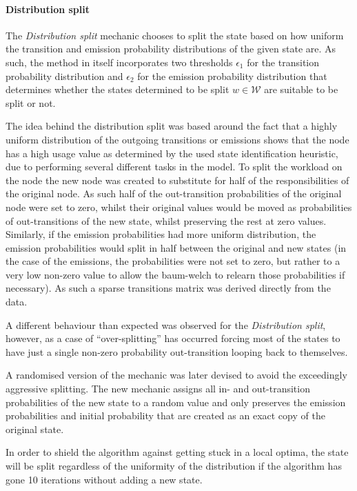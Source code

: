 \paragraph{Distribution split}
The \emph{Distribution split} mechanic chooses to split the state based on how uniform the transition and emission probability distributions of the given state are. As such, the method in itself incorporates two thresholds $\epsilon_1$ for the transition probability distribution and $\epsilon_2$ for the emission probability distribution that determines whether the states determined to be split $w\in\mathcal{W}$ are suitable to be split or not.

The idea behind the distribution split was based around the fact that a highly uniform distribution of the outgoing transitions or emissions shows that the node has a high usage value as determined by the used state identification heuristic, due to performing several different tasks in the model. To split the workload on the node the new node was created to substitute for half of the responsibilities of the original node. As such half of the out-transition probabilities of the original node were set to zero, whilst their original values would be moved as probabilities of out-transitions of the new state, whilst preserving the rest at zero values. Similarly, if the emission probabilities had more uniform distribution, the emission probabilities would split in half between the original and new states (in the case of the emissions, the probabilities were not set to zero, but rather to a very low non-zero value to allow the \gls{baum-welch} to relearn those probabilities if necessary). As such a sparse transitions matrix was derived directly from the data.

A different behaviour than expected was observed for the \emph{Distribution split}, however, as a case of ``over-splitting'' has occurred forcing most of the states to have just a single non-zero probability out-transition looping back to themselves.

A randomised version of the mechanic was later devised to avoid the exceedingly aggressive splitting. The new mechanic assigns all in- and out-transition probabilities of the new state to a random value and only preserves the emission probabilities and initial probability that are created as an exact copy of the original state.

In order to shield the algorithm against getting stuck in a local optima, the state will be split regardless of the uniformity of the distribution if the algorithm has gone 10 iterations without adding a new state.

